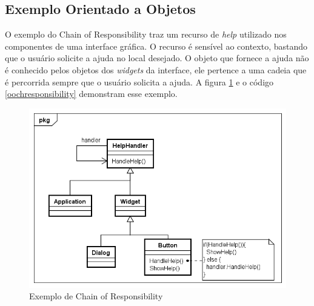 \subsection*{Exemplo Orientado a Objetos}

O exemplo do Chain of Responsibility traz um recurso 
de \textit{help} utilizado nos componentes de uma 
interface gráfica. O recurso é sensível ao contexto, 
bastando que o usuário solicite a ajuda no local 
desejado. O objeto que fornece a ajuda não é 
conhecido pelos objetos dos \textit{widgets} da 
interface, ele pertence a uma cadeia que é 
percorrida sempre que o usuário solicita 
a ajuda. A figura \ref{chain_exemplo} e o código 
\ref{oochresponsibility} demonstram esse exemplo.

\begin{figure}[htb]
	\caption{\label{chain_exemplo}Exemplo de Chain of Responsibility}
	\begin{center}
	    \includegraphics[scale=0.5]{5_padroes-contexto-funcional/5.3_comportamentais/5.3.01_chain-of-responsibility/chainofresponsibility_exemplo.png}
	\end{center}
\end{figure}

